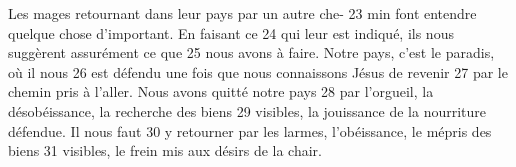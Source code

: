 Les mages retournant dans leur pays par un autre che-	 
23	 	min font entendre quelque chose d'important. En faisant ce	 
24	 	qui leur est indiqué, ils nous suggèrent assurément ce que	 
25	 	nous avons à faire. Notre pays, c'est le paradis, où il nous	 
26	 	est défendu une fois que nous connaissons Jésus de revenir	 
27	 	par le chemin pris à l'aller. Nous avons quitté notre pays	 
28	 	par l'orgueil, la désobéissance, la recherche des biens	 
29	 	visibles, la jouissance de la nourriture défendue. Il nous faut	 
30	 	y retourner par les larmes, l'obéissance, le mépris des biens	 
31	 	visibles, le frein mis aux désirs de la chair.